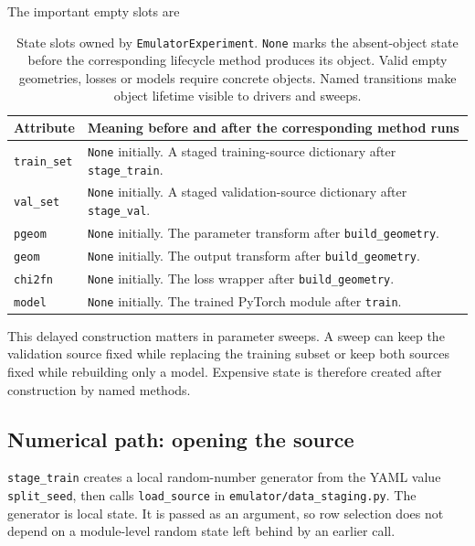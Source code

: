 \documentclass[10pt,aps,prd,twocolumn,nofootinbib]{revtex4-2}
\newcommand{\code}[1]{\texttt{#1}}
\begin{document}
The important empty slots are
\begin{table}[t]
\centering
\begin{tabular}{p{}p{}}
\toprule
Attribute & Meaning before and after the corresponding method runs \\
\midrule
\code{train\_set}
  & \code{None} initially.  A staged training-source dictionary after
    \code{stage\_train}.  \\
\code{val\_set}
  & \code{None} initially.  A staged validation-source dictionary after
    \code{stage\_val}.  \\
\code{pgeom}
  & \code{None} initially.  The parameter transform after
    \code{build\_geometry}.  \\
\code{geom}
  & \code{None} initially.  The output transform after
    \code{build\_geometry}.  \\
\code{chi2fn}
  & \code{None} initially.  The loss wrapper after
    \code{build\_geometry}.  \\
\code{model}
  & \code{None} initially.  The trained PyTorch module after
    \code{train}.  \\
\bottomrule
\end{tabular}
\caption{State slots owned by \code{EmulatorExperiment}.  \code{None} marks
the absent-object state before the corresponding lifecycle method produces
its object.  Valid empty geometries, losses or models require concrete
objects.  Named transitions make object lifetime visible to drivers and sweeps.}
\label{tab:experiment-slots}
\end{table}

This delayed construction matters in parameter sweeps.  A sweep can keep the
validation source fixed while replacing the training subset or keep both
sources fixed while rebuilding only a model.  Expensive state is therefore
created after construction by named methods.

\subsection{Numerical path: opening the source}

\code{stage\_train} creates a local random-number generator from the YAML
value \code{split\_seed}, then calls \code{load\_source} in
\code{emulator/data\_staging.py}.  The generator is local state.  It is passed
as an argument, so row selection does not depend on a module-level random
state left behind by an earlier call.
\end{document}
